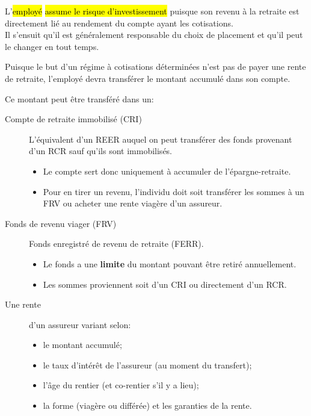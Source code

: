 \documentclass[10pt, french]{article}
\begin{document}
\begin{multicols*}{3}
L'\hl{employé} \hl{assume le risque d'investissement} puisque son revenu à la retraite est directement lié au rendement du compte ayant les cotisations. \\

Il s'ensuit 	qu'il est généralement responsable du choix de placement et qu'il peut le changer en tout temps.

Puisque le but d'un régime à cotisations déterminées n'est pas de payer une rente de retraite, l'employé devra transférer le montant accumulé dans son compte.

\begin{definitionNOHFILLsub}
Ce montant peut être transféré dans un:
\begin{description}
	\item[Compte de retraite immobilisé (CRI)]	L'équivalent d'un REER auquel on peut transférer des fonds provenant d'un RCR sauf qu'ils sont immobilisés.
		\begin{itemize}[leftmargin = *]
		\item	Le compte sert donc uniquement à accumuler de l'épargne-retraite.
		\item	Pour en tirer un revenu, l'individu doit soit transférer les sommes à un FRV ou acheter une rente viagère d'un assureur.
		\end{itemize}
	\item[Fonds de revenu viager (FRV)]	Fonds enregistré de revenu de retraite (FERR).
		\begin{itemize}[leftmargin = *]
		\item	Le fonds a une \textbf{limite} du montant pouvant être retiré annuellement.
		\item	Les sommes proviennent soit d'un CRI ou directement d'un RCR.
		\end{itemize}
	\item[Une rente]d'un assureur variant selon:
		\begin{itemize}[leftmargin = *]
		\item	le montant accumulé;
		\item	le taux d'intérêt de l'assureur (au moment du transfert);
		\item	l'âge du rentier (et co-rentier s'il y a lieu);
		\item	la forme (viagère ou différée) et les garanties de la rente.
		\end{itemize}
\end{description}
\end{definitionNOHFILLsub}


\end{multicols*}
\end{document}
